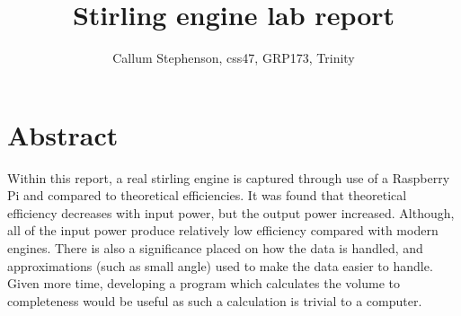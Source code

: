 \documentclass[12pt]{article}
\title{\textbf{Stirling engine lab report}}
\author{Callum Stephenson, css47, GRP173, Trinity}
\date{}
\begin{document}
    \begin{titlepage}
        \thispagestyle{empty}
        \maketitle
    \end{titlepage}
    \tableofcontents
    \section{Abstract}
    Within this report, a real stirling engine is captured through use of a Raspberry Pi and compared to theoretical efficiencies. It was found that theoretical efficiency decreases
    with input power, but the output power increased. Although, all of the input power produce relatively low efficiency compared with modern engines. There is also a significance
    placed on how the data is handled, and approximations (such as small angle) used to make the data easier to handle. Given more time, developing a program which calculates
    the volume to completeness would be useful as such a calculation is trivial to a computer. 
\end{document}
